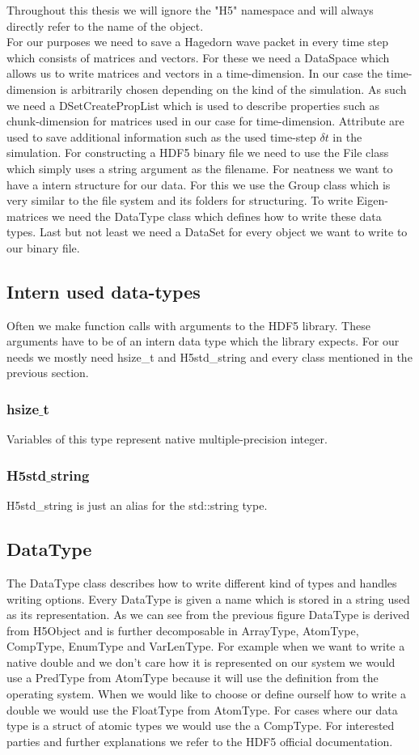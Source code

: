 \documentclass{article}
\begin{document}
Throughout this thesis we will ignore the "H5" namespace and will always directly refer to the name of the object.\\
For our purposes we need to save a Hagedorn wave packet in every time step which consists of matrices and vectors. For these we need a DataSpace which allows us to write matrices and vectors in a time-dimension. In our case the time-dimension is arbitrarily chosen depending on the kind of the simulation. As such we need a DSetCreatePropList which is used to describe properties such as chunk-dimension for matrices used in our case for time-dimension. Attribute are used to save additional information such as the used time-step $\delta t$ in the simulation. For constructing a HDF5 binary file we need to use the File class which simply uses a string argument as the filename. For neatness we want to have a intern structure for our data. For this we use the Group class which is very similar to the file system and its folders for structuring. To write Eigen-matrices we need the DataType class which defines how to write these data types. Last but not least we need a DataSet for every object we want to write to our binary file.

\subsection{Intern used data-types}
Often we make function calls with arguments to the HDF5 library. These arguments have to be of an intern data type which the library expects. For our needs we mostly need hsize\_t and H5std\_string and every class mentioned in the previous section.
\subsubsection{hsize$\_$t}
Variables of this type represent native multiple-precision integer. 
\subsubsection{H5std$\_$string}
H5std\_string is just an alias for the std::string type.
\subsection{DataType}
The DataType class describes how to write different kind of types and handles writing options. Every DataType is given a name which is stored in a string used as its representation. As we can see from the previous figure DataType is derived from H5Object and is further decomposable in ArrayType, AtomType, CompType, EnumType and VarLenType. For example when we want to write a native double and we don't care how it is represented on our system we would use a PredType from AtomType because it will use the definition from the operating system. When we would like to choose or define ourself how to write a double we would use the FloatType from AtomType. For cases where our data type is a struct of atomic types we would use the a CompType. For interested parties and further explanations we refer to the HDF5 official documentation\cite{hdf5doc}.
\end{document}
